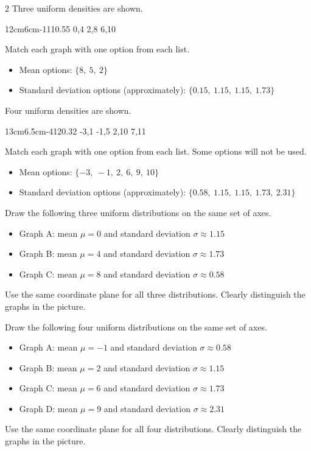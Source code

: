\begin{multicols}{2}
\vspace{-0.25cm}
Three uniform densities are shown.

\UniformThreeGraph
{12cm}{6cm}{-1}{11}{0.55}
{0,4}
{2,8}
{6,10}

Match each graph with one option from each list.
\begin{itemize}
\item Mean options: $\{8,\ 5,\ 2\}$
\item Standard deviation options (approximately): $\{0.15,\ 1.15,\ 1.15,\ 1.73\}$
\end{itemize}

\vspace{-0.25cm}
Four uniform densities are shown.

\UniformFourGraph
{13cm}{6.5cm}{-4}{12}{0.32}
{-3,1}
{-1,5}
{2,10}
{7,11}

Match each graph with one option from each list. Some options will not be used.
\begin{itemize}
\item Mean options: $\{-3,\ -1,\ 2,\ 6,\ 9, \ 10 \}$
\item Standard deviation options (approximately): $\{0.58,\ 1.15,\ 1.15,\ 1.73,\ 2.31\}$
\end{itemize}

\vspace{-0.25cm}
Draw the following three uniform distributions on the same set of axes.
\begin{itemize}
\item Graph A: mean $\mu=0$ and standard deviation $\sigma\approx1.15$
\item Graph B: mean $\mu=4$ and standard deviation $\sigma\approx1.73$
\item Graph C: mean $\mu=8$ and standard deviation $\sigma\approx0.58$
\end{itemize}
Use the same coordinate plane for all three distributions. Clearly distinguish the graphs in the picture.

\vspace{-0.25cm}
Draw the following four uniform distributions on the same set of axes.
\begin{itemize}
\item Graph A: mean $\mu=-1$ and standard deviation $\sigma\approx0.58$
\item Graph B: mean $\mu=2$ and standard deviation $\sigma\approx1.15$
\item Graph C: mean $\mu=6$ and standard deviation $\sigma\approx1.73$
\item Graph D: mean $\mu=9$ and standard deviation $\sigma\approx2.31$
\end{itemize}
Use the same coordinate plane for all four distributions. Clearly distinguish the graphs in the picture.


\end{multicols}
